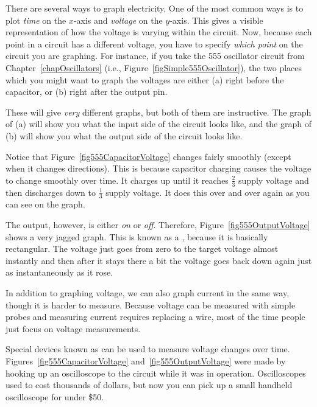 There are several ways to graph electricity.
One of the most common ways is to plot \emph{time} on the $x$-axis and \emph{voltage} on the $y$-axis.  
This gives a visible representation of how the voltage is varying within the circuit.
Now, because each point in a circuit has a different voltage, you have to specify \emph{which point} on the circuit you are graphing.
For instance, if you take the 555 oscillator circuit from Chapter~\ref{chapOscillators} (i.e., Figure~\ref{figSimple555Oscillator}), the two places which you might want to graph the voltages are either (a) right before the capacitor, or (b) right after the output pin.

These will give \emph{very} different graphs, but both of them are instructive.  The graph of (a) will show you what the input side of the circuit looks like, and the graph of (b) will show you what the output side of the circuit looks like.



Notice that Figure~\ref{fig555CapacitorVoltage} changes fairly smoothly (except when it changes directions).
This is because capacitor charging causes the voltage to change smoothly over time.
It charges up until it reaches $\frac{2}{3}$ supply voltage and then discharges down to $\frac{1}{3}$ supply voltage.
It does this over and over again as you can see on the graph.

The output, however, is either \emph{on} or \emph{off}.  
Therefore, Figure~\ref{fig555OutputVoltage} shows a very jagged graph.
This is known as a , because it is basically rectangular.
The voltage just goes from zero to the target voltage almost instantly and then after it stays there a bit the voltage goes back down again just as instantaneously as it rose.

In addition to graphing voltage, we can also graph current in the same way, though it is harder to measure.
Because voltage can be measured with simple probes and measuring current requires replacing a wire, most of the time people just focus on voltage measurements.

Special devices known as  can be used to measure voltage changes over time.
Figures~\ref{fig555CapacitorVoltage} and~\ref{fig555OutputVoltage} were made by hooking up an oscilloscope to the circuit while it was in operation.
Oscilloscopes used to cost thousands of dollars, but now you can pick up a small handheld oscilloscope for under \$50.

